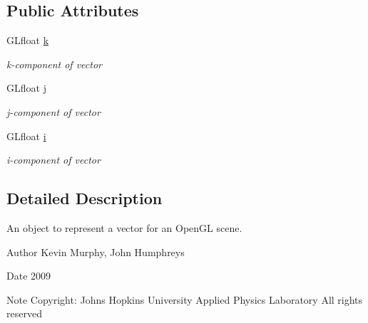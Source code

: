 \subsection*{Public Attributes}
\begin{DoxyCompactItemize}
\item 
\hypertarget{classgl_vector_a4375cc9d4268dde87d991878c0d7d76b}{
GLfloat \hyperlink{classgl_vector_a4375cc9d4268dde87d991878c0d7d76b}{k}}
\label{classgl_vector_a4375cc9d4268dde87d991878c0d7d76b}

\begin{DoxyCompactList}\small\item\em k-\/component of vector \end{DoxyCompactList}\item 
\hypertarget{classgl_vector_a173bd0ac8a3e760a451e0a6fdaa83fff}{
GLfloat \hyperlink{classgl_vector_a173bd0ac8a3e760a451e0a6fdaa83fff}{j}}
\label{classgl_vector_a173bd0ac8a3e760a451e0a6fdaa83fff}

\begin{DoxyCompactList}\small\item\em j-\/component of vector \end{DoxyCompactList}\item 
\hypertarget{classgl_vector_ad7911c034078f75b7382dc43ab2ad4e2}{
GLfloat \hyperlink{classgl_vector_ad7911c034078f75b7382dc43ab2ad4e2}{i}}
\label{classgl_vector_ad7911c034078f75b7382dc43ab2ad4e2}

\begin{DoxyCompactList}\small\item\em i-\/component of vector \end{DoxyCompactList}\end{DoxyCompactItemize}


\subsection{Detailed Description}
An object to represent a vector for an OpenGL scene. 

\begin{DoxyAuthor}{Author}
Kevin Murphy, John Humphreys 
\end{DoxyAuthor}
\begin{DoxyDate}{Date}
2009 
\end{DoxyDate}
\begin{DoxyNote}{Note}
Copyright: Johns Hopkins University Applied Physics Laboratory All rights reserved 
\end{DoxyNote}


